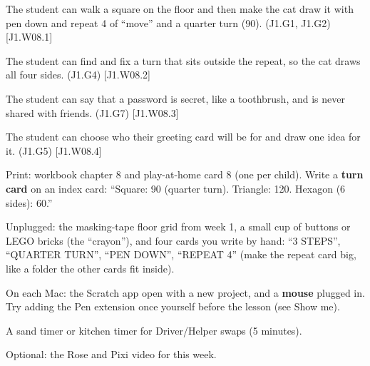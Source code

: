 
\begin{objectives}
  \item The student can walk a square on the floor and then make the cat draw it with pen down and repeat 4 of \enquote{move} and a quarter turn (90). (J1.G1, J1.G2) [J1.W08.1]
  \item The student can find and fix a turn that sits outside the repeat, so the cat draws all four sides. (J1.G4) [J1.W08.2]
  \item The student can say that a password is secret, like a toothbrush, and is never shared with friends. (J1.G7) [J1.W08.3]
  \item The student can choose who their greeting card will be for and draw one idea for it. (J1.G5) [J1.W08.4]
\end{objectives}

\begin{materials}
  \item Print: workbook chapter 8 and play-at-home card 8 (one per child). Write a \textbf{turn card} on an index card: \enquote{Square: 90 (quarter turn). Triangle: 120. Hexagon (6 sides): 60.}
  \item Unplugged: the masking-tape floor grid from week 1, a small cup of buttons or LEGO bricks (the \enquote{crayon}), and four cards you write by hand: \enquote{3 STEPS}, \enquote{QUARTER TURN}, \enquote{PEN DOWN}, \enquote{REPEAT 4} (make the repeat card big, like a folder the other cards fit inside).
  \item On each Mac: the Scratch app open with a new project, and a \textbf{mouse} plugged in. Try adding the Pen extension once yourself before the lesson (see Show me).
  \item A sand timer or kitchen timer for Driver/Helper swaps (5 minutes).
  \item Optional: the Rose and Pixi video for this week.
\end{materials}

